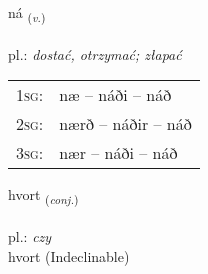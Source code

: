\documentclass[frontgrid, backgrid]{flacards}\usepackage[]{graphicx}\usepackage[]{xcolor}
\begin{document}
{ná \small{\textsubscript{(\textit{v.})}} \\[1ex] %
\textphonetic{[nauː]} \\
pl.: \emph{dostać, otrzymać; złapać} \\  [2ex]
\renewcommand*{\arraystretch}{0.8}
\begin{tabular}{p{1cm}l}
\textsc{1sg}: & næ -- náði -- náð \\ 
\textsc{2sg}: & nærð -- náðir -- náð \\ 
\textsc{3sg}: & nær -- náði -- náð \\ 
\end{tabular}
}


\renewcommand{\flhead}{\vskip5pt \fboxsep=0pt {\small\bfseries\footnotesize Samtenging | spójnik}}
\renewcommand{\fcfoot}{\vskip5pt \fboxsep=0pt \hspace{2pt}{\small\bfseries\footnotesize 1K}}

\renewcommand{\blhead}{\vskip5pt {\small\bfseries\footnotesize Samtenging | spójnik }}
\renewcommand{\bcfoot}{\vskip5pt \hspace{2pt}{\small\bfseries\footnotesize 1K}}


{hvort \small{\textsubscript{(\textit{conj.})}} \\[1ex]
\textphonetic{[kʰvɔr̥t]} \\
pl.: \emph{czy} \\  [2ex]
hvort (Indeclinable)}

\renewcommand{\flhead}{\vskip5pt \fboxsep=0pt {\small\bfseries\footnotesize Lýsingarorð | przymiotnik}}
\renewcommand{\fcfoot}{\vskip5pt \fboxsep=0pt \hspace{2pt}{\small\bfseries\footnotesize 1K}}

\renewcommand{\blhead}{\vskip5pt {\small\bfseries\footnotesize Lýsingarorð | przymiotnik }}
\renewcommand{\bcfoot}{\vskip5pt \hspace{2pt}{\small\bfseries\footnotesize 1K}}
\end{document}
